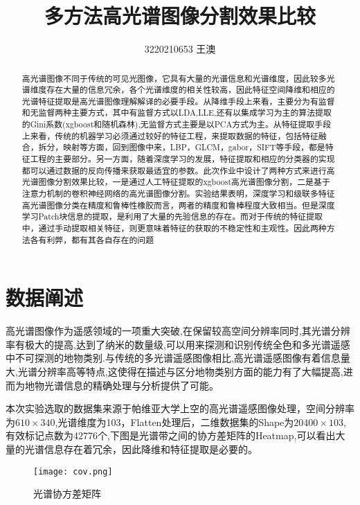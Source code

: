 \documentclass[runningheads]{llncs}
\begin{document}
%
\title{多方法高光谱图像分割效果比较}
%
%
\author{3220210653 
王澳}
%
%
%
\maketitle              %
%
\begin{abstract}
高光谱图像不同于传统的可见光图像，它具有大量的光谱信息和光谱维度，因此较多光谱维度存在大量的信息冗余，各个光谱维度的相关性较高，因此特征空间降维和相应的光谱特征提取是高光谱图像理解解译的必要手段。从降维手段上来看，主要分为有监督和无监督两种主要方式，其中有监督方式以LDA,LLE,还有以集成学习为主的算法提取的Gini系数(xgboost和随机森林),无监督方式主要是以PCA方式为主。从特征提取手段上来看，传统的机器学习必须通过较好的特征工程，来提取数据的特征，包括特征融合，拆分，映射等方面，回到图像中来，LBP，GLCM，gabor，SIFT等手段，都是特征工程的主要部分。另一方面，随着深度学习的发展，特征提取和相应的分类器的实现都可以通过数据的反向传播来获取最适宜的参数。此次作业中设计了两种方式来进行高光谱图像分割效果比较，一是通过人工特征提取的xgboost高光谱图像分割，二是基于注意力机制的卷积神经网络的高光谱图像分割。实验结果表明，深度学习和级联多特征高光谱图像分类在精度和鲁棒性橡胶而言，两者的精度和鲁棒程度大致相当。但是深度学习Patch块信息的提取，是利用了大量的先验信息的存在。而对于传统的特征提取中，通过手动提取相关特征，则更意味着特征的获取的不稳定性和主观性。因此两种方法各有利弊，都有其各自存在的问题

\end{abstract}
%
%
%
\section{数据阐述}
高光谱图像作为遥感领域的一项重大突破,在保留较高空间分辨率同时,其光谱分辨率有极大的提高,达到了纳米的数量级,可以用来探测和识别传统全色和多光谱遥感中不可探测的地物类别.与传统的多光谱遥感图像相比,高光谱遥感图像有着信息量大,光谱分辨率高等特点,这使得在描述与区分地物类别方面的能力有了大幅提高,进而为地物光谱信息的精确处理与分析提供了可能\cite{何同弟0高光谱图像的分类技术研究}。

本次实验选取的数据集来源于帕维亚大学上空的高光谱遥感图像处理，空间分辨率为$610 \times 340$,光谱维度为103，Flatten处理后，二维数据集的Shape为$20400 \times 103 $,有效标记点数为42776个,下图是光谱带之间的协方差矩阵的Heatmap,可以看出大量的光谱信息存在着冗余，因此降维和特征提取是必要的。
\begin{figure}
    \centering
    \texttt{[image: cov.png]}
    \caption{光谱协方差矩阵}
    \label{guan}
\end{figure}
\end{document}
